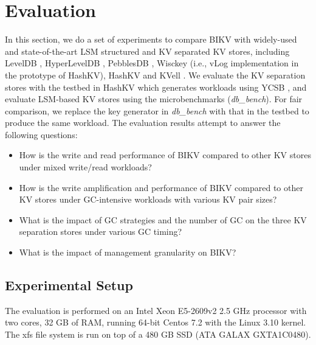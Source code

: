 \documentclass[sigconf]{acmart}
\begin{document}
\section{Evaluation} \label{sec4}
In this section, we do a set of experiments to compare BIKV with widely-used and state-of-the-art LSM structured and KV separated KV stores, including LevelDB \cite{LevelDB}, HyperLevelDB \cite{HyperLevelDB}, PebblesDB \cite{PebblesDB}, Wisckey \cite{Wisckey} (i.e., vLog implementation in the prototype of HashKV), HashKV \cite{HashKV} and KVell \cite{KVell}. We evaluate the KV separation stores with the testbed in HashKV which generates workloads using YCSB \cite{YCSB}, and evaluate LSM-based KV stores using the microbenchmarks (\textit{db\_bench}). For fair comparison, we replace the key generator in \textit{db\_bench} with that in the testbed to produce the same workload. The evaluation results attempt to answer the following questions:
\begin{itemize}
	\item How is the write and read performance of BIKV compared to other KV stores under mixed write/read workloads?
	\item How is the write amplification and performance of BIKV compared to other KV stores under GC-intensive workloads with various KV pair sizes?
	\item What is the impact of GC strategies and the number of GC on the three  KV separation stores under various GC timing?  
	\item What is the impact of management granularity on BIKV?
\end{itemize}

\subsection{Experimental Setup}
The evaluation is performed on an Intel Xeon E5-2609v2 2.5 GHz processor with two cores, 32 GB of RAM, running 64-bit Centos 7.2 with the Linux 3.10 kernel. The xfs file system is run on top of a 480 GB SSD (ATA GALAX GXTA1C0480). 
\end{document}
